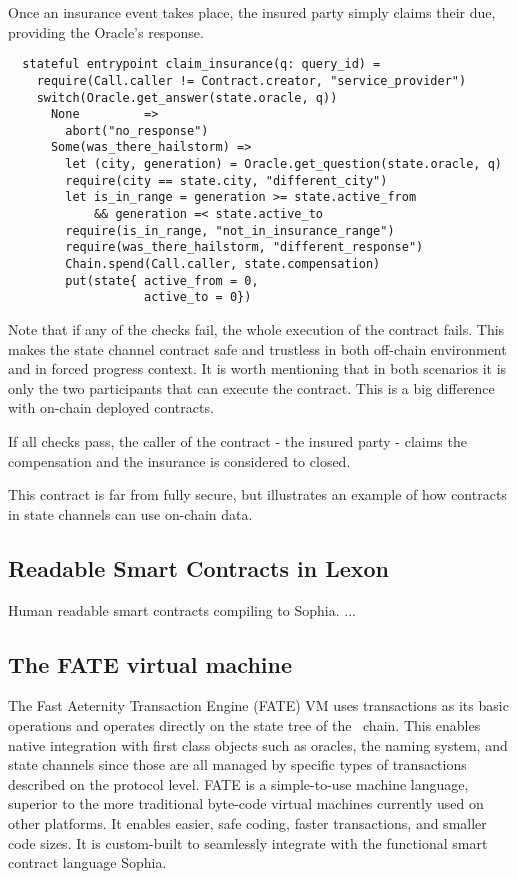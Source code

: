 Once an insurance event takes place, the insured party simply claims their
due, providing the Oracle's response.

\begin{verbatim}
  stateful entrypoint claim_insurance(q: query_id) =
    require(Call.caller != Contract.creator, "service_provider")
    switch(Oracle.get_answer(state.oracle, q))
      None         =>
        abort("no_response")
      Some(was_there_hailstorm) =>
        let (city, generation) = Oracle.get_question(state.oracle, q)
        require(city == state.city, "different_city")
        let is_in_range = generation >= state.active_from 
            && generation =< state.active_to
        require(is_in_range, "not_in_insurance_range")
        require(was_there_hailstorm, "different_response")
        Chain.spend(Call.caller, state.compensation)
        put(state{ active_from = 0,
                   active_to = 0})
\end{verbatim}

Note that if any of the checks fail, the whole execution of the contract
fails. This makes the state channel contract safe and trustless in both
off-chain environment and in forced progress context. It is worth mentioning
that in both scenarios it is only the two participants that can execute the
contract. This is a big difference with on-chain deployed contracts.

If all checks pass, the caller of the contract - the insured party - claims
the compensation and the insurance is considered to closed.

This contract is far from fully secure, but illustrates an example of
how contracts in state channels can use on-chain data.

\subsection{Readable Smart Contracts in Lexon}
Human readable smart contracts compiling to Sophia.
...

\subsection{The FATE virtual machine}
\label{sect:fate}

The Fast Aeternity Transaction Engine (FATE) VM uses transactions as
its basic operations and operates directly on the state tree of the
\aet\ chain. This enables native integration with first class
objects such as oracles, the naming system, and state channels since
those are all managed by specific types of transactions described on
the protocol level. FATE is a simple-to-use machine language, superior
to the more traditional byte-code virtual machines currently used on
other platforms. It enables easier, safe coding, faster transactions,
and smaller code sizes. It is custom-built to seamlessly integrate
with the functional smart contract language Sophia.


